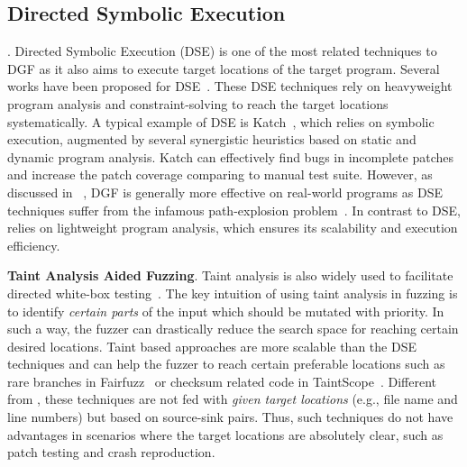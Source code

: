 \subsection{Directed Symbolic Execution}.
Directed Symbolic Execution (DSE) is one of the most related techniques to DGF as it also aims to execute target locations of the target program.
Several works have been proposed for DSE~\cite{dart, Ma:2011:DSE:2041552.2041563, Haller:2013:DOG, Jin:2012, Marinescu:2013:katch}.
These DSE techniques rely on heavyweight program analysis and  constraint-solving to reach the target locations systematically.
A typical example of DSE is Katch~\cite{Marinescu:2013:katch}, which relies on symbolic execution, augmented by several synergistic heuristics based on static and dynamic program analysis.
Katch can effectively find bugs in incomplete patches and increase the patch coverage comparing to manual test suite.
However, as discussed in ~\cite{Bohme:2017:DGF}, DGF is generally more effective on real-world programs as DSE techniques suffer from the infamous path-explosion problem~\cite{Stephens2016Driller}.
In contrast to DSE, \dFOT relies on  lightweight program analysis, which ensures its scalability and execution efficiency.

\noindent\textbf{Taint Analysis Aided Fuzzing}.
Taint analysis is also widely used to facilitate directed white-box testing~\cite{Ganesh:2009:TDW, rawat:2017, wangwgz:2010, Angora,FairFuzz}.
The key intuition of using taint analysis in fuzzing is to identify \emph{certain parts} of the input which should be mutated with priority.
In such a way, the fuzzer can drastically reduce the search space for reaching certain desired locations.
Taint based approaches are more scalable than the DSE techniques and can help the fuzzer to reach certain preferable locations such as rare branches in Fairfuzz~\cite{FairFuzz} or checksum related code in TaintScope~\cite{wangwgz:2010}.
Different from \dFOT, these techniques are not fed with \emph{given target locations} (e.g., file name and line numbers) but based on source-sink pairs.
Thus, such techniques do not have advantages in scenarios where the target locations are absolutely clear, such as patch testing and crash reproduction. 


